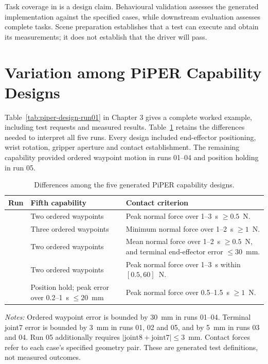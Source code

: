 Task coverage in  is a design claim. Behavioural validation
assesses the generated implementation against the specified cases, while
downstream evaluation assesses complete tasks.
Scene preparation establishes that a test can execute and obtain its
measurements; it does not establish that the driver will pass.

\section{Variation among PiPER Capability Designs}
\label{sec:appendix-piper-designs}

Table~\ref{tab:piper-design-run01} in Chapter 3 gives a complete worked
example, including test requests and measured results.
Table~\ref{tab:appendix-piper-comparison} retains the differences needed to
interpret all five runs. Every design included end-effector positioning,
wrist rotation, gripper aperture and contact establishment.
The remaining capability provided ordered waypoint motion in runs 01--04
and position holding in run 05.

\begin{table}[htbp]
  \centering
  \begingroup
  \small
  \setlength{\tabcolsep}{3pt}
  \renewcommand{\arraystretch}{1.2}
  \caption{Differences among the five generated PiPER capability designs.}
  \label{tab:appendix-piper-comparison}
  \begin{tabularx}{\textwidth}{@{}>{\centering\arraybackslash}p{8mm}
    >{\raggedright\arraybackslash}p{36mm}
    >{\raggedright\arraybackslash}X@{}}
    \toprule
    \textbf{Run} & \textbf{Fifth capability} &
    \textbf{Contact criterion} \\
    \midrule
    01 & Two ordered waypoints &
    Peak normal force over 1--3~s $\geq 0.5$~N. \\
    02 & Three ordered waypoints &
    Minimum normal force over 1--2~s $\geq 1$~N. \\
    03 & Two ordered waypoints &
    Mean normal force over 1--2~s $\geq 0.5$~N, and terminal
    end-effector error $\leq 30$~mm. \\
    04 & Two ordered waypoints &
    Peak normal force over 1--3~s within $[0.5,60]$~N. \\
    05 & Position hold; peak error over 0.2--1~s $\leq 20$~mm &
    Peak normal force over 0.5--1.5~s $\geq 1$~N. \\
    \bottomrule
  \end{tabularx}
  \par\smallskip
  \noindent\raggedright\emph{Notes:} Ordered waypoint error is bounded by
  30~mm in runs 01--04. Terminal joint7 error is bounded by 3~mm in
  runs 01, 02 and 05, and by 5~mm in runs 03 and 04.
  Run 05 additionally requires
  $|\mathrm{joint8}+\mathrm{joint7}|\leq 3$~mm.
  Contact forces refer to each case's specified geometry pair.
  These are generated test definitions, not measured outcomes.\par
  \endgroup
\end{table}

